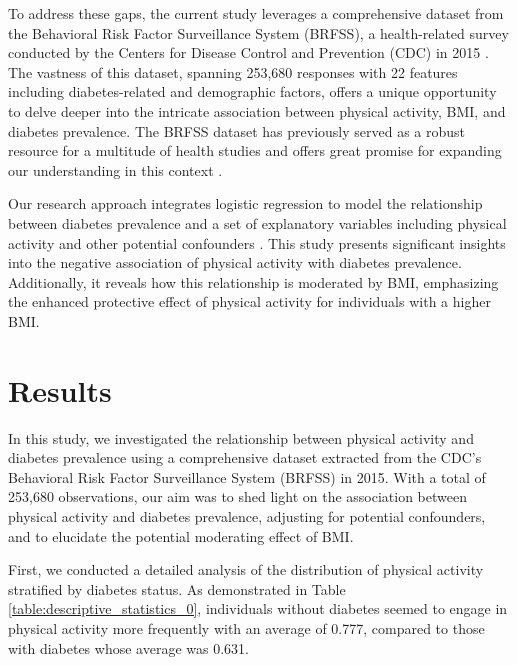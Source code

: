 \documentclass[11pt]{article}
\begin{document}
To address these gaps, the current study leverages a comprehensive dataset from the Behavioral Risk Factor Surveillance System (BRFSS), a health-related survey conducted by the Centers for Disease Control and Prevention (CDC) in 2015 \cite{Rolle-Lake2020BehavioralRF}. The vastness of this dataset, spanning 253,680 responses with 22 features including diabetes-related and demographic factors, offers a unique opportunity to delve deeper into the intricate association between physical activity, BMI, and diabetes prevalence. The BRFSS dataset has previously served as a robust resource for a multitude of health studies and offers great promise for expanding our understanding in this context \cite{Preedy1989BehavioralRF}.

Our research approach integrates logistic regression to model the relationship between diabetes prevalence and a set of explanatory variables including physical activity and other potential confounders \cite{Menard1996AppliedLR}. This study presents significant insights into the negative association of physical activity with diabetes prevalence. Additionally, it reveals how this relationship is moderated by BMI, emphasizing the enhanced protective effect of physical activity for individuals with a higher BMI.

\section*{Results}

In this study, we investigated the relationship between physical activity and diabetes prevalence using a comprehensive dataset extracted from the CDC's Behavioral Risk Factor Surveillance System (BRFSS) in 2015. With a total of 253,680 observations, our aim was to shed light on the association between physical activity and diabetes prevalence, adjusting for potential confounders, and to elucidate the potential moderating effect of BMI.

First, we conducted a detailed analysis of the distribution of physical activity stratified by diabetes status. As demonstrated in Table \ref{table:descriptive_statistics_0}, individuals without diabetes seemed to engage in physical activity more frequently with an average of 0.777, compared to those with diabetes whose average was 0.631. 
\end{document}
